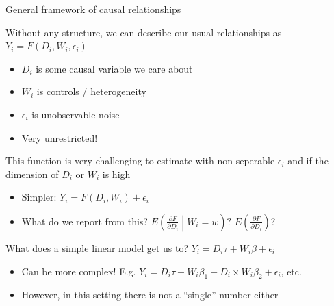 \documentclass[notes,11pt, aspectratio=169]{beamer}
\newcommand\1{\operatorname{\mathbbm{1}}\indicatorfence}
\newenvironment{wideitemize}{\itemize\addtolength{\itemsep}{10pt}}{\enditemize}
\begin{document}
\begin{frame}{General framework of causal relationships}
  \begin{wideitemize}
  \item Without any structure, we can describe our usual relationships
    as $Y_{i} = F(D_{i}, W_{i},\epsilon_{i})$
    \begin{itemize}
    \item $D_{i}$ is some causal variable we care about
    \item $W_{i}$ is controls / heterogeneity
    \item $\epsilon_{i}$ is unobservable noise
    \item Very unrestricted!
    \end{itemize}
  \item This function is very challenging to estimate with
    non-seperable $\epsilon_{i}$ and if the dimension of $D_{i}$ or
    $W_{i}$ is high
    \begin{itemize}
    \item Simpler: $Y_{i} = F(D_{i}, W_{i}) + \epsilon_{i}$
    \item What do we report from this? $E\left(\frac{\partial{F}}{\partial D_{i}} \middle| W_{i} = w\right)?$ $E\left(\frac{\partial{F}}{\partial D_{i}} \right)$?
    \end{itemize}
  \item What does a simple linear model get us to? $Y_{i} = D_{i}\tau + W_{i}\beta + \epsilon_{i}$
    \begin{itemize}
    \item Can be more complex! E.g.
      $Y_{i} = D_{i}\tau + W_{i}\beta_{1} + D_{i} \times
      W_{i}\beta_{2} + \epsilon_{i}$, etc.
    \item However, in this setting there is not a ``single'' number
      either
    \end{itemize}
  \end{wideitemize}
\end{frame}
\end{document}
